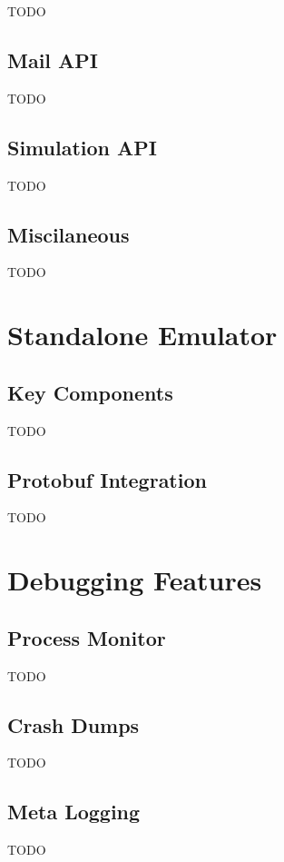 TODO

\subsection{Mail API}

TODO

\subsection{Simulation API}

TODO

\subsection{Miscilaneous}

TODO


\section{Standalone Emulator}

\subsection{Key Components}

TODO

\subsection{Protobuf Integration}

TODO


\section{Debugging Features}

\subsection{Process Monitor}

TODO

\subsection{Crash Dumps}

TODO

\subsection{Meta Logging}

TODO
